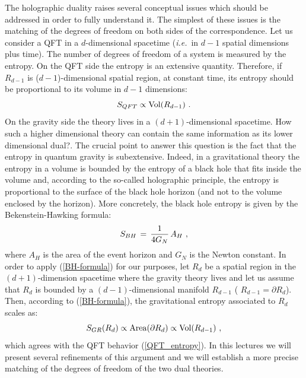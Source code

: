 \documentclass[12pt,notitlepage,a4paper]{article}
\newcommand{\beq}{\begin{equation}}
\newcommand{\eeq}{\end{equation}}
\def\ie{{\emph{i.e.}}}
\begin{document}
The holographic duality raises several conceptual issues which should be addressed in order to fully understand it. The simplest of these issues is the 
matching of the degrees of freedom on both sides of the correspondence.  Let us consider a QFT in a $d$-dimensional spacetime (\ie\ in $d-1$ spatial dimensions plus time). The number of degrees of freedom of a system is measured by the entropy. On the QFT side the entropy is an extensive quantity. Therefore, if  $R_{d-1}$ is  ($d-1$)-dimensional spatial region, at constant time,  its entropy should be proportional to its volume in $d-1$ dimensions:
\beq
S_{QFT}\propto {\rm Vol}(R_{d-1})\,\,.
\label{QFT_entropy}
\eeq
On the gravity side the theory lives in a $(d+1)$-dimensional spacetime. How such a higher dimensional theory can contain the same information as its lower dimensional dual?. The crucial point to answer this question is the fact  that the entropy in quantum gravity is subextensive. Indeed, in a gravitational theory the entropy in a volume is bounded by the entropy of a black hole that fits inside the volume and, according to the so-called holographic principle, the entropy is proportional to the surface of the black hole horizon (and not to  the volume enclosed by the horizon). More concretely, the black hole entropy is given by the 
Bekenstein-Hawking formula:
\beq
S_{BH}\,=\,{1\over 4 G_N}\,A_{H}\,\,,
\label{BH-formula}
\eeq
where $A_H$ is the area of the event horizon and $G_N$ is the Newton constant. In order to apply (\ref{BH-formula}) for our purposes, let $R_{d}$ be a spatial region in  the $(d+1)$-dimension spacetime where the gravity theory lives and let us assume that  $R_{d}$ is bounded by a $(d-1)$-dimensional manifold $R_{d-1}$ ( $R_{d-1}=\partial R_{d}$). Then, according to (\ref{BH-formula}), the gravitational entropy associated to $R_{d}$ scales as:
\beq
S_{GR} (R_{d})\propto {\rm Area}(\partial R_{d})\propto {\rm Vol} (R_{d-1})\,\,,
\label{GR_entropy}
\eeq
which agrees with the QFT behavior (\ref{QFT_entropy}). In this lectures we will present several refinements of this argument and we will establish a more precise matching of the degrees of freedom of the two dual theories.
\end{document}
